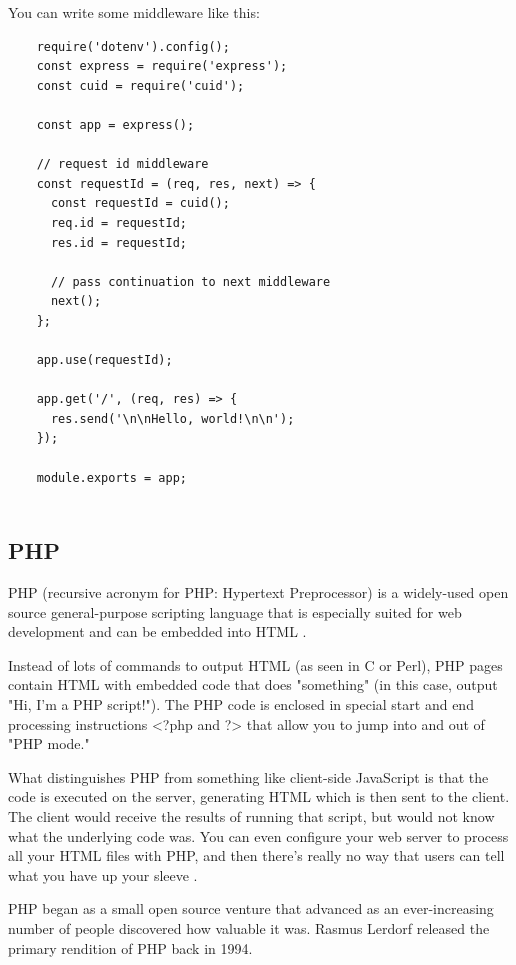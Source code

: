 \documentclass[../thesis.tex]{subfiles}
\begin{document}
You can write some middleware like this:
\begin{lstlisting}
    require('dotenv').config();
    const express = require('express');
    const cuid = require('cuid');
    
    const app = express();
    
    // request id middleware
    const requestId = (req, res, next) => {
      const requestId = cuid();
      req.id = requestId;
      res.id = requestId;
    
      // pass continuation to next middleware
      next();
    };
    
    app.use(requestId);
    
    app.get('/', (req, res) => {
      res.send('\n\nHello, world!\n\n');
    });
    
    module.exports = app;
    
\end{lstlisting}
\newpage

\subsection{PHP}
PHP (recursive acronym for PHP: Hypertext Preprocessor) is a widely-used open source general-purpose scripting language that is especially suited for web development and can be embedded into HTML \cite{php}.
\newline

Instead of lots of commands to output HTML (as seen in C or Perl), PHP pages contain HTML with embedded code that does "something" (in this case, output "Hi, I'm a PHP script!"). The PHP code is enclosed in special start and end processing instructions <?php and ?> that allow you to jump into and out of "PHP mode."
\newline
    
What distinguishes PHP from something like client-side JavaScript is that the code is executed on the server, generating HTML which is then sent to the client. The client would receive the results of running that script, but would not know what the underlying code was. You can even configure your web server to process all your HTML files with PHP, and then there's really no way that users can tell what you have up your sleeve \cite{php}.
\newline

PHP began as a small open source venture that advanced as an ever-increasing number of people discovered how valuable it was. Rasmus Lerdorf released the primary rendition of PHP back in 1994.
\newline
    
\end{document}
